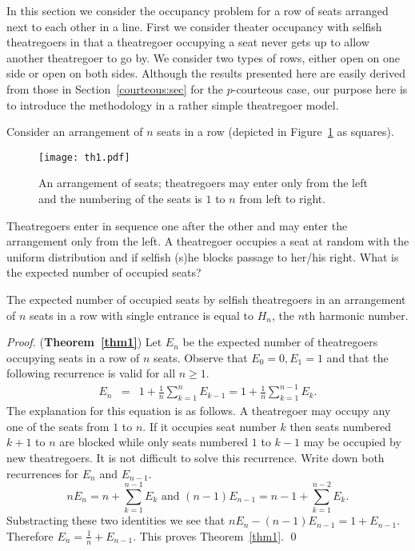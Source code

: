 \documentclass[11pt]{llncs}
\begin{document}
In this section we consider the occupancy problem for a row of seats
arranged next to each other in a line.
First we consider theater occupancy with
selfish theatregoers in that a theatregoer occupying a
seat never gets up to allow another theatregoer to go by.
We consider two types of rows, either
open on one side or open on both sides.
Although the results presented here are easily derived from those 
in Section~\ref{courteous:sec} for the $p$-courteous case,
our purpose here is to introduce the methodology in
a rather simple theatregoer model.



Consider an arrangement of $n$ seats in a row
(depicted in Figure~\ref{fig:th1} as squares).
\begin{figure}[!htb]
\begin{center}
\texttt{[image: th1.pdf]}\end{center}
\caption{An arrangement of seats; theatregoers may enter only from the left
and the numbering of the seats is $1$ to $n$ from left to right.}
\label{fig:th1}
\end{figure}
Theatregoers enter in sequence one after 
the other and may enter the arrangement only from the left.
A theatregoer occupies a seat at random with the uniform distribution
and if selfish (s)he
blocks passage 
to her/his right. What is the expected number 
of occupied seats?



\begin{theorem}
\label{thm1}
The expected number of occupied seats by selfish theatregoers
in an arrangement of $n$ seats
in a row with single entrance is equal to $H_n$, the $n$th harmonic number.
\end{theorem}
\begin{proof} ({\bf Theorem~\ref{thm1}})
Let $E_n$ be the expected number of theatregoers occupying seats 
in a row of $n$ seats.
Observe that $E_0=0, E_1 =1$ and that the following recurrence is valid
for all $n \geq 1$.
\begin{eqnarray}
E_n &=& \label{maineq1}
1 + \frac{1}{n} \sum_{k=1}^{n} E_{k-1} 
= 1 + \frac{1}{n} \sum_{k=1}^{n-1} E_k.
\end{eqnarray}
The explanation for this equation is as follows. A theatregoer
may occupy any one of the seats from $1$ to $n$. If it
occupies seat number $k$ then seats numbered $k+1$ to $n$
are blocked while only seats numbered $1$ to $k-1$ may be
occupied by new theatregoers. 
It is not difficult to solve this recurrence. Write down
both recurrences for $E_n$ and $E_{n-1}$.
\begin{equation*}
nE_n 
=
n + \sum_{k=1}^{n-1} E_k 
\mbox{ and } 
(n-1)E_{n-1}
= n-1 + \sum_{k=1}^{n-2} E_k.
\end{equation*}
Substracting these two identities we see that
$nE_n - (n-1) E_{n-1} = 1 + E_{n-1}$.
Therefore $E_n = \frac{1}{n} + E_{n-1}$.
This proves Theorem~\ref{thm1}.
\qed
\end{proof}
\end{document}
